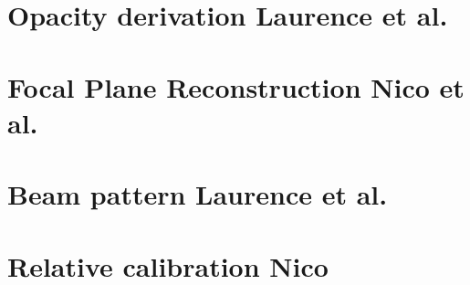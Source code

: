 \documentclass[a4paper, 11pt]{report}
\begin{document}
\clearpage
\chapter{Opacity derivation {\color{YellowGreen} Laurence et al.}}
\label{se:opacities}


\clearpage
\chapter{Focal Plane Reconstruction {\color{Blue} Nico et al.}}
\label{se:fp_reconstruction}



\clearpage
\chapter{Beam pattern {\color{blue} Laurence et al.} }
\label{se:beams}

%


\clearpage
\chapter{Relative calibration {\color{blue} Nico} }
\label{se:flat_field}



\clearpage
\end{document}
